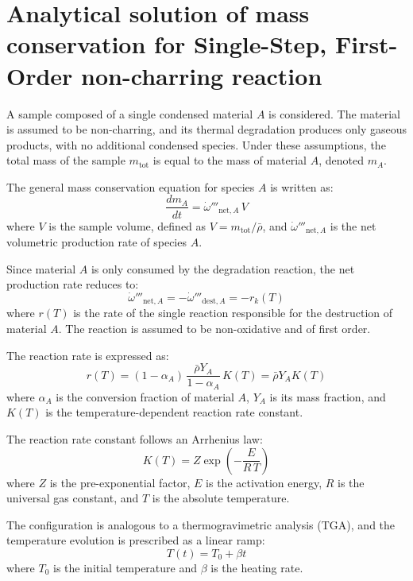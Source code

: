 \section{Analytical solution of mass conservation for Single-Step, First-Order  non-charring reaction}
\label{ann:analytical_TGA}

A sample composed of a single condensed material $A$ is considered.
The material is assumed to be non-charring, and its thermal degradation produces only gaseous products, with no additional condensed species.
Under these assumptions, the total mass of the sample $m_{\mathrm{tot}}$ is equal to the mass of material $A$, denoted $m_A$.

The general mass conservation equation for species $A$ is written as:
\begin{equation}
\frac{dm_A}{dt} = \dot{\omega}'''_{\mathrm{net},A}\, V
\label{eq:mass_balance_general}
\end{equation}
where $V$ is the sample volume, defined as $V = m_{\mathrm{tot}} / \bar{\rho}$, and $\dot{\omega}'''_{\mathrm{net},A}$ is the net volumetric production rate of species $A$.

Since material $A$ is only consumed by the degradation reaction, the net production rate reduces to:
\begin{equation}
\dot{\omega}'''_{\mathrm{net},A}
= - \dot{\omega}'''_{\mathrm{dest},A}
= - r_k(T)
\end{equation}
where $r(T)$ is the rate of the single reaction responsible for the destruction of material $A$.
The reaction is assumed to be non-oxidative and of first order.

The reaction rate is expressed as:
\begin{equation}
r(T) =
(1 - \alpha_A)\,
\frac{\bar{\rho} Y_A}{1 - \alpha_A}\,
K(T)
= \bar{\rho} Y_A K(T)
\end{equation}
where $\alpha_A$ is the conversion fraction of material $A$, $Y_A$ is its mass fraction, and $K(T)$ is the temperature-dependent reaction rate constant.

The reaction rate constant follows an Arrhenius law:
\begin{equation}
K(T) = Z \exp\!\left(-\frac{E}{R\,T}\right)
\end{equation}
where $Z$ is the pre-exponential factor, $E$ is the activation energy, $R$ is the universal gas constant, and $T$ is the absolute temperature.

The configuration is analogous to a thermogravimetric analysis (TGA), and the temperature evolution is prescribed as a linear ramp:
\begin{equation}
T(t) = T_0 + \beta t
\end{equation}
where $T_0$ is the initial temperature and $\beta$ is the heating rate.

